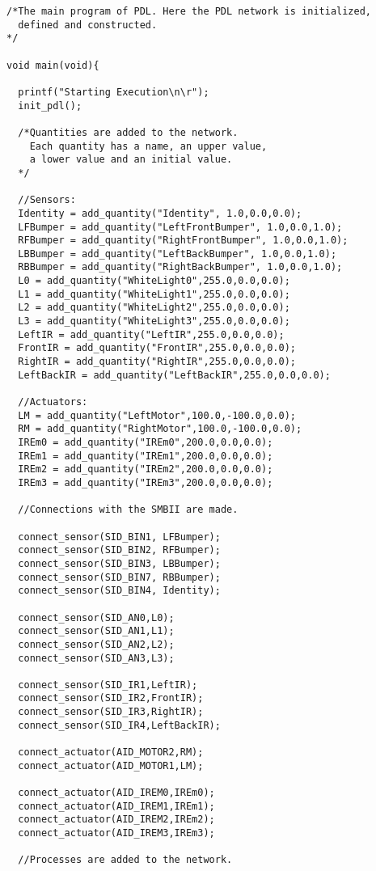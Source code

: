{\begin{verbatim}
/*The main program of PDL. Here the PDL network is initialized,
  defined and constructed.
*/

void main(void){

  printf("Starting Execution\n\r");
  init_pdl();

  /*Quantities are added to the network.
    Each quantity has a name, an upper value,
    a lower value and an initial value.
  */
     
  //Sensors:
  Identity = add_quantity("Identity", 1.0,0.0,0.0);
  LFBumper = add_quantity("LeftFrontBumper", 1.0,0.0,1.0);
  RFBumper = add_quantity("RightFrontBumper", 1.0,0.0,1.0);
  LBBumper = add_quantity("LeftBackBumper", 1.0,0.0,1.0);
  RBBumper = add_quantity("RightBackBumper", 1.0,0.0,1.0);
  L0 = add_quantity("WhiteLight0",255.0,0.0,0.0);
  L1 = add_quantity("WhiteLight1",255.0,0.0,0.0);
  L2 = add_quantity("WhiteLight2",255.0,0.0,0.0);
  L3 = add_quantity("WhiteLight3",255.0,0.0,0.0);
  LeftIR = add_quantity("LeftIR",255.0,0.0,0.0);
  FrontIR = add_quantity("FrontIR",255.0,0.0,0.0);
  RightIR = add_quantity("RightIR",255.0,0.0,0.0);
  LeftBackIR = add_quantity("LeftBackIR",255.0,0.0,0.0);

  //Actuators:
  LM = add_quantity("LeftMotor",100.0,-100.0,0.0);
  RM = add_quantity("RightMotor",100.0,-100.0,0.0);  
  IREm0 = add_quantity("IREm0",200.0,0.0,0.0);
  IREm1 = add_quantity("IREm1",200.0,0.0,0.0);
  IREm2 = add_quantity("IREm2",200.0,0.0,0.0);
  IREm3 = add_quantity("IREm3",200.0,0.0,0.0);

  //Connections with the SMBII are made.

  connect_sensor(SID_BIN1, LFBumper);
  connect_sensor(SID_BIN2, RFBumper);
  connect_sensor(SID_BIN3, LBBumper);
  connect_sensor(SID_BIN7, RBBumper);
  connect_sensor(SID_BIN4, Identity);

  connect_sensor(SID_AN0,L0);
  connect_sensor(SID_AN1,L1);
  connect_sensor(SID_AN2,L2);
  connect_sensor(SID_AN3,L3);
  
  connect_sensor(SID_IR1,LeftIR);
  connect_sensor(SID_IR2,FrontIR);
  connect_sensor(SID_IR3,RightIR);
  connect_sensor(SID_IR4,LeftBackIR);
  
  connect_actuator(AID_MOTOR2,RM);
  connect_actuator(AID_MOTOR1,LM);
  
  connect_actuator(AID_IREM0,IREm0);
  connect_actuator(AID_IREM1,IREm1);
  connect_actuator(AID_IREM2,IREm2);
  connect_actuator(AID_IREM3,IREm3);

  //Processes are added to the network.


\end{verbatim}}
